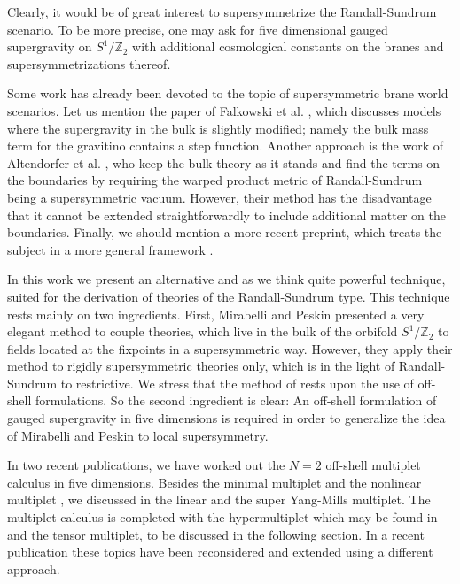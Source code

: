 \documentclass[a4paper,12pt, twoside]{article}
\numberwithin{equation}{section}
\begin{document}
Clearly, it would be of great interest to supersymmetrize the 
Randall-Sundrum scenario. To be more precise, one may ask for five dimensional 
gauged supergravity \cite{D'Auria:1981kq} on $S^1/\mathbb{Z}_2$ with 
additional cosmological constants on the branes and supersymmetrizations 
thereof. 

 Some work has already been devoted to the topic of supersymmetric 
brane world scenarios. Let us mention the paper of Falkowski et al. 
\cite{Falkowski:2000er}, which discusses models where the supergravity in the 
bulk is slightly modified; namely the bulk mass term for the gravitino 
contains a step function. Another approach is the work of Altendorfer 
et al. \cite{Altendorfer:2000rr}, who keep the bulk theory as it stands 
and find the terms on the boundaries by requiring the warped product 
metric of Randall-Sundrum being a supersymmetric vacuum. However, their 
method has the disadvantage that it cannot be extended straightforwardly 
to include additional matter on the boundaries. Finally, we should 
mention a more recent preprint, which treats the subject in a more general 
framework \cite{Bergshoeff:2000zn}.

In this work we present an alternative and as we think quite powerful 
technique, suited for the derivation of theories of the Randall-Sundrum 
type. This technique rests mainly on two ingredients. First, Mirabelli 
and Peskin \cite{Mirabelli:1998aj} presented a very elegant method to 
couple theories, which live in the bulk of the orbifold 
$S^1/\mathbb{Z}_2$ to fields located at the fixpoints in a supersymmetric way. However, 
they apply their method to rigidly supersymmetric theories only, which 
is in the light of Randall-Sundrum to restrictive. We stress that the 
method of \cite{Mirabelli:1998aj} rests upon the use of off-shell 
formulations. So the second ingredient is clear: An off-shell formulation of 
gauged supergravity in five dimensions is required in order to 
generalize the idea of Mirabelli and Peskin to local supersymmetry. 

In two recent publications, we have worked out the $N=2$ off-shell 
multiplet calculus in five dimensions. Besides the minimal multiplet and 
the nonlinear multiplet \cite {Zucker:2000ej}, we discussed in 
\cite{Zucker:1999fn} the linear and the super Yang-Mills multiplet. The multiplet 
calculus is completed with the hypermultiplet which may be found in 
\cite{diss} and the tensor multiplet, to be discussed in the following 
section. In a recent publication \cite{Kugo:2000hn} these topics have been 
reconsidered and extended using a different approach.
\end{document}
